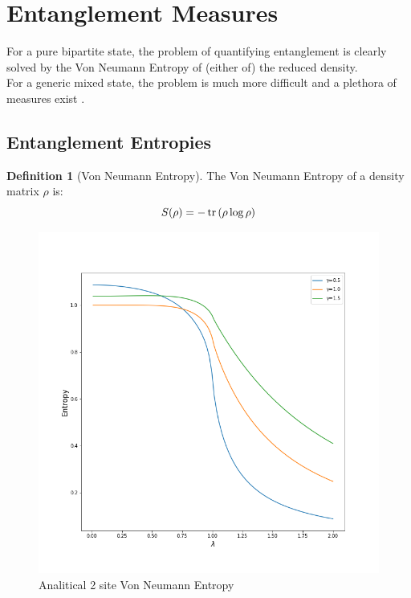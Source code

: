 \documentclass[12pt,a4paper]{book}
\theoremstyle{definition}
\newtheorem{definition}{Definition}[section]
\begin{document}
\section{Entanglement Measures}
For a pure bipartite state, the problem of quantifying entanglement is clearly solved by the Von Neumann Entropy of (either of) the reduced density.\\
For a generic mixed state, the problem is much more difficult and
a plethora of measures exist \cite{RevModPhys.80.517}.

\subsection{Entanglement Entropies}

\begin{definition}[Von Neumann Entropy]
 The Von Neumann Entropy of a density matrix $\rho$ is:
  \begin{equation}
	S(\rho)=-\tr\left(\rho \log \rho \right)
  \end{equation}
\end{definition}
\begin{figure}[h]
	\centering
	\includegraphics[width=0.7\linewidth]{graphs/entropy_3gammas}
	\caption{Analitical 2 site Von Neumann Entropy}
	\label{fig:entropy3gammas}
\end{figure}
\end{document}
